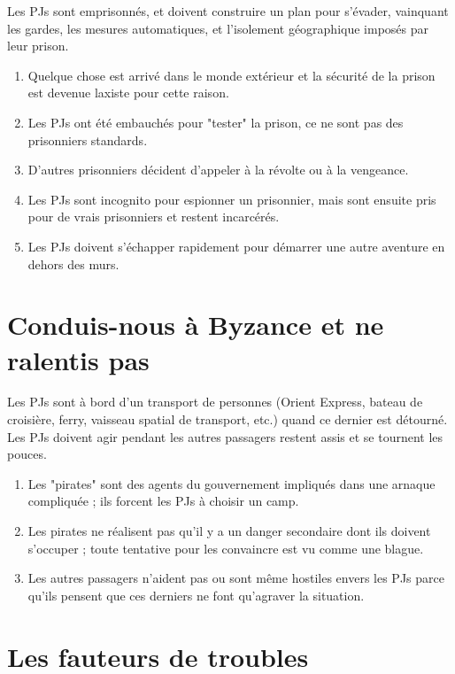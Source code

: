 \begin{multicols}{2}
Les PJs sont emprisonnés, et doivent construire un plan pour s'évader, vainquant les gardes, les mesures automatiques, et l'isolement géographique imposés par leur prison.

\themes
\begin{enumerate}
\item Quelque chose est arrivé dans le monde extérieur et la sécurité de la prison est devenue laxiste pour cette raison.
\item Les PJs ont été embauchés pour "tester" la prison, ce ne sont pas des prisonniers standards.
\item D'autres prisonniers décident d'appeler à la révolte ou à la vengeance.
\item Les PJs sont incognito pour espionner un prisonnier, mais sont ensuite pris pour de vrais prisonniers et restent incarcérés.
\item Les PJs doivent s'échapper rapidement pour démarrer une autre aventure en dehors des murs.
\end{enumerate}

\section{Conduis-nous à Byzance et ne ralentis pas}
\label{byzance}


Les PJs sont à bord d'un transport de personnes (Orient Express, bateau de croisière, ferry, vaisseau spatial de transport, etc.) quand ce dernier est détourné. Les PJs doivent agir pendant les autres passagers restent assis et se tournent les pouces.

\themes
\begin{enumerate}
\item Les "pirates" sont des agents du gouvernement impliqués dans une arnaque compliquée ; ils forcent les PJs à choisir un camp.
\item Les pirates ne réalisent pas qu'il y a un danger secondaire dont ils doivent s'occuper ; toute tentative pour les convaincre est vu comme une blague.
\item Les autres passagers n'aident pas ou sont même hostiles envers les PJs parce qu'ils pensent que ces derniers ne font qu'agraver la situation.
\end{enumerate}

\section{Les fauteurs de troubles}
\label{troubles}


\end{multicols}
